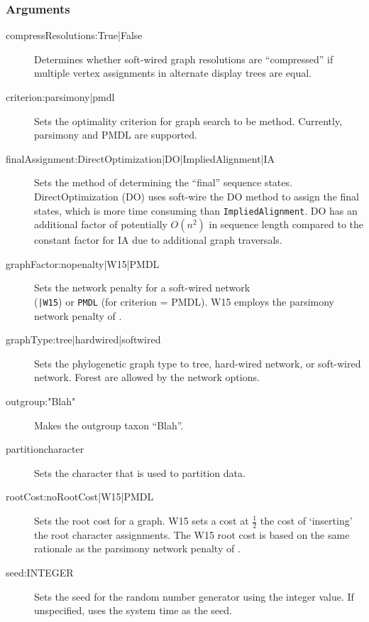 	\subsubsection{Arguments}
		\begin{description}
			\item[compressResolutions:True|False] Determines whether soft-wired graph 
			resolutions are ``compressed'' if multiple vertex assignments in alternate display 
			trees are equal.
			
			\item[criterion:parsimony|pmdl] Sets the optimality criterion for graph search to be 
			method. Currently, parsimony and PMDL \citep{WheelerandVaron2022} are supported.
			
			\item[finalAssignment:DirectOptimization|DO|ImpliedAlignment|IA] Sets the method 
			of determining the ``final'' sequence states. DirectOptimization (DO) uses soft-wire the DO 
			method to assign the final states, which is more time consuming than \texttt{ImpliedAlignment}. 
			DO has an additional factor of potentially $O(n^2)$ in sequence length compared 
			to the constant factor for IA due to additional graph traversals.
			
			\item[graphFactor:nopenalty|W15|PMDL] Sets the network penalty for a soft-wired network\\ 
			(\texttt{|W15}) or \texttt{PMDL} (for criterion = PMDL). W15 employs the
			parsimony network penalty of \cite{Wheeler2015}.
			
			\item[graphType:tree|hardwired|softwired] Sets the phylogenetic graph type to tree, 
			hard-wired network, or soft-wired network. Forest are allowed by the network options.
			
			\item[outgroup:"Blah"] Makes the outgroup taxon ``Blah''. 
			
			\item[partitioncharacter] Sets the character that is used to partition data.
			
			\item[rootCost:noRootCost|W15|PMDL] Sets the root cost for a graph. W15 sets a 
			cost at $\frac{1}{2}$ the cost of `inserting' the root character assignments. 
			The W15 root cost is based on the same rationale as the parsimony network penalty of
			 \cite{Wheeler2015}.
			 
			 \item[seed:INTEGER] Sets the seed for the random number generator using the integer
			 value. If unspecified, \phyg uses the system time as the seed.
		\end{description}
					
